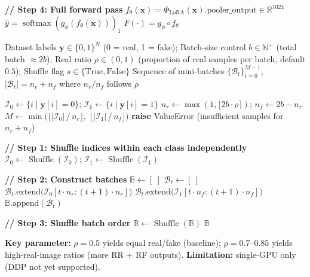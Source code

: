 \documentclass[12pt]{article}
\begin{document}
\begin{algorithm}[p]
\begin{algorithmic}[1]
\State \textbf{// Step 4: Full forward pass}
\State $f_\theta(\mathbf{x}) = \Phi_{\text{LoRA}}(\mathbf{x}).\text{pooler\_output} \in \mathbb{R}^{1024}$ 
\State $\hat{y} = \operatorname{softmax}(g_\phi(f_\theta(\mathbf{x})))_1$ 
\State \Return $F(\cdot) = g_\phi \circ f_\theta$
\end{algorithmic}
\end{algorithm}

\clearpage
\begin{algorithm}[p]
\caption{BalanceBatchSampler (v1): Class-Balanced Mini-Batch Construction}
\label{alg:balance}
\begin{algorithmic}[1]
\Require
  Dataset labels $\mathbf{y} \in \{0,1\}^{N}$ (0 = real, 1 = fake);
  Batch-size control $b \in \mathbb{N}^+$ (total batch $\approx 2b$);
  Real ratio $\rho \in (0,1)$ (proportion of real samples per batch, default $0.5$);
  Shuffle flag $s \in \{\text{True}, \text{False}\}$
\Ensure
  Sequence of mini-batches $\{\mathcal{B}_t\}_{t=0}^{M-1}$,
  $|\mathcal{B}_t| = n_r + n_f$ where $n_r/n_f$ follows $\rho$

\State $\mathcal{I}_0 \gets \{i \mid \mathbf{y}[i] = 0\}$; \quad $\mathcal{I}_1 \gets \{i \mid \mathbf{y}[i] = 1\}$
\State $n_r \gets \max(1, \lfloor 2b \cdot \rho \rceil)$; \quad $n_f \gets 2b - n_r$
\State $M \gets \min\big(\lfloor |\mathcal{I}_0| \,/\, n_r \rfloor,\; \lfloor |\mathcal{I}_1| \,/\, n_f \rfloor\big)$
  \State \textbf{raise} ValueError (insufficient samples for $n_r + n_f$)
\EndIf

\State \textbf{// Step 1: Shuffle indices within each class independently}
  \State $\mathcal{I}_0 \gets \operatorname{Shuffle}(\mathcal{I}_0)$; \quad $\mathcal{I}_1 \gets \operatorname{Shuffle}(\mathcal{I}_1)$
\EndIf

\State \textbf{// Step 2: Construct batches}
\State $\mathbb{B} \gets [\;]$
  \State $\mathcal{B}_t \gets [\;]$
  \State $\mathcal{B}_t.\text{extend}\big(\mathcal{I}_0[t \cdot n_r : (t+1) \cdot n_r]\big)$ 
  \State $\mathcal{B}_t.\text{extend}\big(\mathcal{I}_1[t \cdot n_f : (t+1) \cdot n_f]\big)$ 
  \State $\mathbb{B}.\text{append}(\mathcal{B}_t)$
\EndFor

\State \textbf{// Step 3: Shuffle batch order}
  \State $\mathbb{B} \gets \operatorname{Shuffle}(\mathbb{B})$
\EndIf
\State \Return $\mathbb{B}$

\vspace{4pt}
\State \textbf{Key parameter:} $\rho = 0.5$ yields equal real/fake (baseline);
\State $\rho = 0.7$--$0.85$ yields high-real-image ratios (more RR + RF outputs).
\State \textbf{Limitation:} single-GPU only (DDP not yet supported).
\end{algorithmic}
\end{algorithm}
\end{document}
